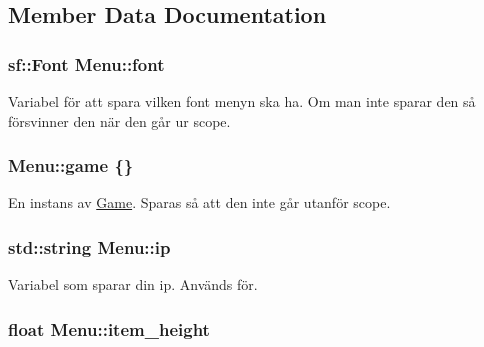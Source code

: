 \subsection{Member Data Documentation}
\hypertarget{classMenu_a9446727ebf60c6063218b5d4bcae170a}{
\subsubsection[{font}]{\setlength{\rightskip}{0pt plus 5cm}sf\+::\+Font Menu\+::font\hspace{0.3cm}{\ttfamily [private]}}}\label{classMenu_a9446727ebf60c6063218b5d4bcae170a}
Variabel för att spara vilken font menyn ska ha. Om man inte sparar den så försvinner den när den går ur scope. \hypertarget{classMenu_a600e0c5a79a2200f64d7c3d5626c026d}{
\subsubsection[{game}]{ Menu\+::game \{\}\hspace{0.3cm}{\ttfamily [private]}}}\label{classMenu_a600e0c5a79a2200f64d7c3d5626c026d}


En instans av \hyperlink{classGame}{Game}. Sparas så att den inte går utanför scope. 

\hypertarget{classMenu_ae225c68be6780e064e5f1e6f57d68d5e}{
\subsubsection[{ip}]{\setlength{\rightskip}{0pt plus 5cm}std\+::string Menu\+::ip\hspace{0.3cm}{\ttfamily [private]}}}\label{classMenu_ae225c68be6780e064e5f1e6f57d68d5e}


Variabel som sparar din ip. Används för. 

\hypertarget{classMenu_a715ee3491fe1a3f34061a5a17ef4871e}{
\subsubsection[{item\+\_\+height}]{\setlength{\rightskip}{0pt plus 5cm}float Menu\+::item\+\_\+height\hspace{0.3cm}{\ttfamily [private]}}}\label{classMenu_a715ee3491fe1a3f34061a5a17ef4871e}


